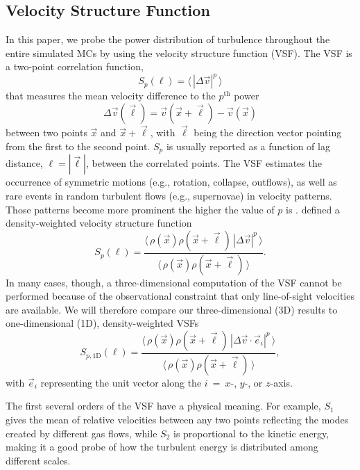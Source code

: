 \subsection{Velocity Structure Function}\label{methods:vsf}

In this paper, we probe the power distribution of turbulence throughout the entire simulated MCs by using the velocity structure function (VSF).
The VSF is a two-point correlation function,
\begin{equation}
	{S}_p (\ell) = \langle \, |\Delta \vec{v}|^p  \, \rangle
	\label{equ:method:def_vsf}
\end{equation}
that measures the mean velocity difference to the $p^\mathrm{th}$ power
\begin{equation}\Delta \vec{v} (\vec{\ell}) = \vec{v}(\vec{x}+\vec{\ell}) - \vec{v}(\vec{x})
\end{equation} 
between two points $\vec{x}$ and $\vec{x}+\vec{\ell}$, with $\vec{\ell}$ being the direction vector pointing from the first to the second point.  
$S_p$ is usually reported as a function of lag distance, $\ell = |\vec{\ell}|$, between the correlated points.
The VSF estimates the occurrence of symmetric motions (e.g., rotation, collapse, outflows), as well as rare events in random turbulent flows (e.g., supernovae) in velocity patterns.
Those patterns become more prominent the higher the value of $p$ is \citep{Heyer2004}.
\citet{Padoan2016a} defined a density-weighted velocity structure function
\begin{equation}
	{S}_p (\ell) = \frac{\langle \, \rho(\vec{x}) \rho(\vec{x}+\vec{\ell}) \, |\Delta \vec{v}|^p  \, \rangle}{\langle  \, \rho(\vec{x}) \rho(\vec{x}+\vec{\ell}) \, \rangle}.
	\label{equ:method:def_vsf_dw}
\end{equation}
In many cases, though, a three-dimensional computation of the VSF cannot be performed because of the observational constraint that only line-of-sight velocities are available.
We will therefore compare our three-dimensional (3D) results to one-dimensional (1D), density-weighted VSFs
\begin{equation}
	\mathit{S}_{p,\mathrm{1D}} (\ell) = \frac{\langle \, \rho(\vec{x}) \rho(\vec{x}+\vec{\ell}) \, |\Delta 
        \vec{v} \cdot \vec{e}_i|^p  \, \rangle}{\langle  \, \rho(\vec{x}) \rho(\vec{x}+\vec{\ell}) \, \rangle} ,
	\label{equ:method:def_vsf_1d}
\end{equation}
with $\vec{e}_i$ representing the unit vector along the $i$~=~$x$-, $y$-, or $z$-axis.

The first several orders of the VSF have a physical meaning. 
For example, $\mathit{S}_1$ gives the mean of relative velocities between any two points reflecting the modes created by different gas flows, while $\mathit{S}_2$ is proportional to the kinetic energy, making it a good probe of how the turbulent energy is distributed among different scales.

